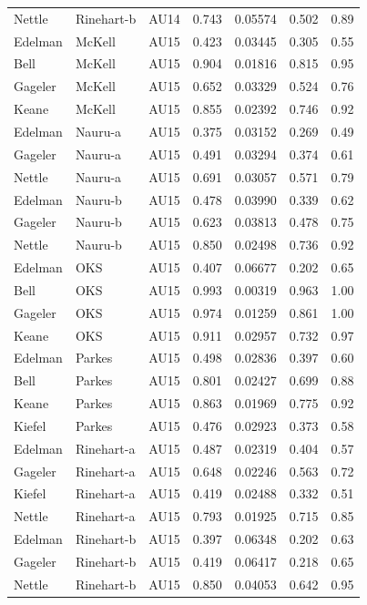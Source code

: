 \documentclass{monashthesis}
\begin{document}
\begin{center}
\begin{longtable}{lllllll}
Nettle & Rinehart-b & AU14 & 0.743 & 0.05574 & 0.502 & 0.89 \\
Edelman & McKell & AU15 & 0.423 & 0.03445 & 0.305 & 0.55 \\
Bell & McKell & AU15 & 0.904 & 0.01816 & 0.815 & 0.95 \\
Gageler & McKell & AU15 & 0.652 & 0.03329 & 0.524 & 0.76 \\
Keane & McKell & AU15 & 0.855 & 0.02392 & 0.746 & 0.92 \\
Edelman & Nauru-a & AU15 & 0.375 & 0.03152 & 0.269 & 0.49 \\
Gageler & Nauru-a & AU15 & 0.491 & 0.03294 & 0.374 & 0.61 \\
Nettle & Nauru-a & AU15 & 0.691 & 0.03057 & 0.571 & 0.79 \\
Edelman & Nauru-b & AU15 & 0.478 & 0.03990 & 0.339 & 0.62 \\
Gageler & Nauru-b & AU15 & 0.623 & 0.03813 & 0.478 & 0.75 \\
Nettle & Nauru-b & AU15 & 0.850 & 0.02498 & 0.736 & 0.92 \\
Edelman & OKS & AU15 & 0.407 & 0.06677 & 0.202 & 0.65 \\
Bell & OKS & AU15 & 0.993 & 0.00319 & 0.963 & 1.00 \\
Gageler & OKS & AU15 & 0.974 & 0.01259 & 0.861 & 1.00 \\
Keane & OKS & AU15 & 0.911 & 0.02957 & 0.732 & 0.97 \\
Edelman & Parkes & AU15 & 0.498 & 0.02836 & 0.397 & 0.60 \\
Bell & Parkes & AU15 & 0.801 & 0.02427 & 0.699 & 0.88 \\
Keane & Parkes & AU15 & 0.863 & 0.01969 & 0.775 & 0.92 \\
Kiefel & Parkes & AU15 & 0.476 & 0.02923 & 0.373 & 0.58 \\
Edelman & Rinehart-a & AU15 & 0.487 & 0.02319 & 0.404 & 0.57 \\
Gageler & Rinehart-a & AU15 & 0.648 & 0.02246 & 0.563 & 0.72 \\
Kiefel & Rinehart-a & AU15 & 0.419 & 0.02488 & 0.332 & 0.51 \\
Nettle & Rinehart-a & AU15 & 0.793 & 0.01925 & 0.715 & 0.85 \\
Edelman & Rinehart-b & AU15 & 0.397 & 0.06348 & 0.202 & 0.63 \\
Gageler & Rinehart-b & AU15 & 0.419 & 0.06417 & 0.218 & 0.65 \\
Nettle & Rinehart-b & AU15 & 0.850 & 0.04053 & 0.642 & 0.95 \\

\end{longtable}
\end{center}
\end{document}
